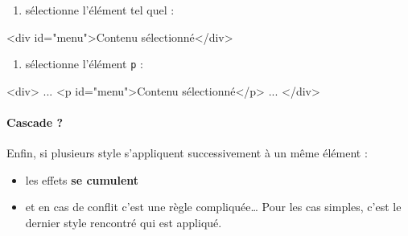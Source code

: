 \documentclass[a4paper,17pt]{extarticle}
\providecommand{\tightlist}{%
      \setlength{\itemsep}{0pt}\setlength{\parskip}{0pt}}
\newenvironment{Shaded}{}{}
\newcommand{\FunctionTok}[1]{\textcolor[rgb]{0.02,0.16,0.49}{{#1}}}
\newcommand{\NormalTok}[1]{{#1}}
\newcommand{\OperatorTok}[1]{\textcolor[rgb]{0.40,0.40,0.40}{{#1}}}
\begin{document}
\begin{reponse}
\begin{enumerate}
\def\labelenumi{\arabic{enumi}.}
\tightlist
\item
  sélectionne l'élément tel quel :
\end{enumerate}

\begin{Shaded}
\begin{Highlighting}[]
\NormalTok{\textless{}div id="menu"}\OperatorTok{\textgreater{}}\NormalTok{Contenu sélectionné\textless{}/div}\OperatorTok{\textgreater{}}
\end{Highlighting}
\end{Shaded}

\begin{enumerate}
\def\labelenumi{\arabic{enumi}.}
\setcounter{enumi}{1}
\tightlist
\item
  sélectionne l'élément \texttt{p} :
\end{enumerate}

\begin{Shaded}
\begin{Highlighting}[]
\NormalTok{\textless{}div}\OperatorTok{\textgreater{}}
    \FunctionTok{...}
\NormalTok{    \textless{}p id="menu"}\OperatorTok{\textgreater{}}\NormalTok{Contenu sélectionné\textless{}/p}\OperatorTok{\textgreater{}}
    \FunctionTok{...}
\NormalTok{\textless{}/div}\OperatorTok{\textgreater{}}
\end{Highlighting}
\end{Shaded}

            \end{reponse}
    \hypertarget{cascade}{%
\paragraph{Cascade ?}\label{cascade}}

    Enfin, si plusieurs style s'appliquent successivement à un même élément
:

\begin{itemize}
\tightlist
\item
  les effets \textbf{se cumulent}
\item
  et en cas de conflit c'est une règle compliquée\ldots{} Pour les cas
  simples, c'est le dernier style rencontré qui est appliqué.
\end{itemize}


    
    
    
\end{document}
